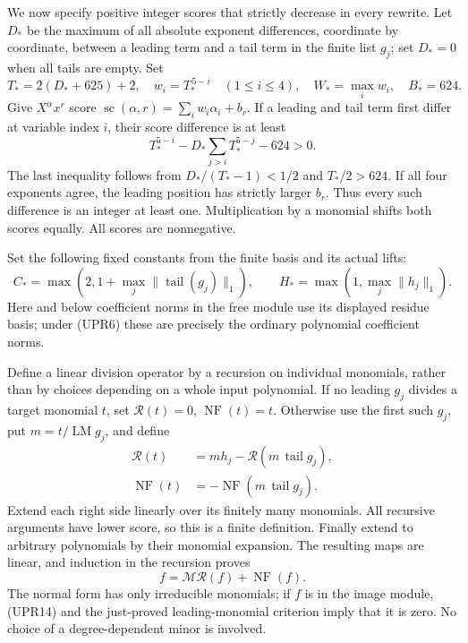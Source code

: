 \documentclass[11pt,a4paper]{article}
\begin{document}
We now specify positive integer scores that strictly decrease in
every rewrite.  Let \(D_*\) be the maximum of all absolute exponent
differences, coordinate by coordinate, between a leading term and
a tail term in the finite list \(g_j\); set \(D_*=0\) when all tails
are empty.  Set
\[
T_*=2(D_*+625)+2,\quad
w_i=T_*^{\,5-i}\quad(1\le i\le4),\quad
W_*=\max_i w_i,\quad B_*=624.
\tag{UPR11}
\]
Give \(X^\alpha x^r\) score
\(\operatorname{sc}(\alpha,r)=\sum_iw_i\alpha_i+b_r\).
If a leading and tail term first differ at variable index \(i\),
their score difference is at least
\[
T_*^{5-i}
-D_*\sum_{j>i}T_*^{5-j}-624>0.
\]
The last inequality follows from
\(D_*/(T_*-1)<1/2\) and \(T_*/2>624\).
If all four exponents agree, the leading position has strictly
larger \(b_r\).  Thus every such difference is an integer at least
one.  Multiplication by a monomial shifts both scores equally.
All scores are nonnegative.

Set the following fixed constants from the finite basis and its
actual lifts:
\[
C_*=\max\left(2,1+\max_j\|\operatorname{tail}(g_j)\|_1\right),
\qquad H_*=\max\left(1,\max_j\|h_j\|_1\right).
\tag{UPR12}
\]
Here and below coefficient norms in the free module use its
displayed residue basis; under (UPR6) these are precisely the
ordinary polynomial coefficient norms.

Define a linear division operator by a recursion on individual
monomials, rather than by choices depending on a whole input
polynomial.  If no leading \(g_j\) divides a target monomial \(t\),
set \(\mathcal R(t)=0\), \(\operatorname{NF}(t)=t\).
Otherwise use the first such \(g_j\), put \(m=t/\operatorname{LM}g_j\),
and define
\[
\begin{split}
\mathcal R(t)&=m h_j-\mathcal R(m\,\operatorname{tail}g_j),\\
\operatorname{NF}(t)&=-\operatorname{NF}
                         (m\,\operatorname{tail}g_j).
\end{split}
\tag{UPR13}
\]
Extend each right side linearly over its finitely many monomials.
All recursive arguments have lower score, so this is a finite
definition.  Finally extend to arbitrary polynomials by their
monomial expansion.  The resulting maps are linear, and induction
in the recursion proves
\[
f=\mathcal M\mathcal R(f)+\operatorname{NF}(f).
\tag{UPR14}
\]
The normal form has only irreducible monomials; if \(f\) is in
the image module, (UPR14) and the just-proved leading-monomial
criterion imply that it is zero.  No choice of a degree-dependent
minor is involved.
\end{document}
